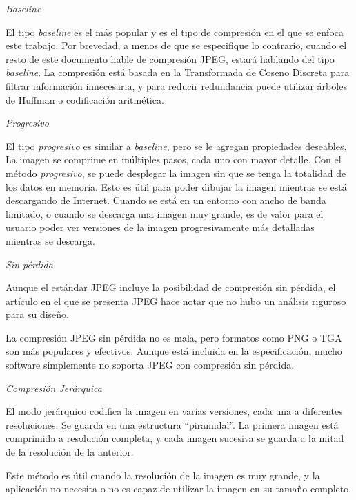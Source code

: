 \begin{list}{}{} \item \emph{Baseline}

El tipo \emph{\gls{baseline}} es el más popular y es el tipo de compresión en el que
se enfoca este trabajo. Por brevedad, a menos de que se especifique lo
contrario, cuando el resto de este documento hable de compresión JPEG, estará
hablando del tipo \emph{baseline}. La compresión está basada en la Transformada
de Coseno Discreta para filtrar información innecesaria, y para reducir
redundancia puede utilizar árboles de Huffman o codificación aritmética.

\item \emph{Progresivo}

El tipo \emph{progresivo} es similar a \emph{baseline}, pero se le agregan
propiedades deseables. La imagen se comprime en múltiples pasos, cada uno con
mayor detalle. Con el método \emph{progresivo}, se puede desplegar la imagen
sin que se tenga la totalidad de los datos en memoria. Esto es útil para poder
dibujar la imagen mientras se está descargando de Internet. Cuando se está en
un entorno con ancho de banda limitado, o cuando se descarga una imagen muy
grande, es de valor para el usuario poder ver versiones de la imagen
progresivamente más detalladas mientras se descarga.

\item \emph{Sin pérdida}

Aunque el estándar JPEG incluye la posibilidad de compresión sin pérdida, el
artículo en el que se presenta JPEG \cite{jpeg-paper} hace notar que no hubo un
análisis riguroso para su diseño.

La compresión JPEG sin pérdida no es mala, pero formatos como PNG o TGA son más
populares y efectivos. Aunque está incluida en la especificación, mucho
software simplemente no soporta JPEG con compresión sin pérdida.

\item \emph{Compresión Jerárquica}

El modo jerárquico codifica la imagen en varias versiones, cada una a
diferentes resoluciones. Se guarda en una estructura ``piramidal''. La primera
imagen está comprimida a resolución completa, y cada imagen sucesiva se guarda
a la mitad de la resolución de la anterior.

Este método es útil cuando la resolución de la imagen es muy grande, y la
aplicación no necesita o no es capaz de utilizar la imagen en su tamaño
completo.

\end{list}

